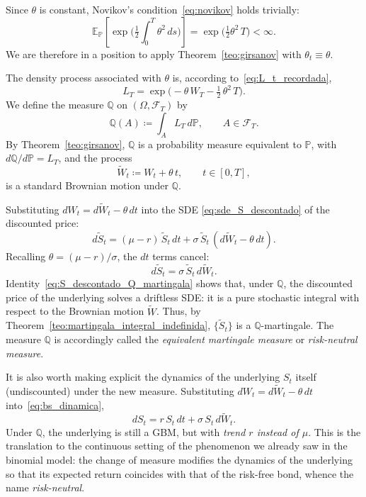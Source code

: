 \documentclass[11pt,a4paper,oneside]{report}
\theoremstyle{plain}
\theoremstyle{definition}
\theoremstyle{remark}
\newcommand{\E}{\mathbb{E}}
\newcommand{\PP}{\mathbb{P}}
\newcommand{\Q}{\mathbb{Q}}
\newcommand{\F}{\mathcal{F}}
\newcommand{\1}{\mathbf{1}}
\newcommand{\eqdef}{\coloneqq}
\begin{document}
Since $\theta$
is constant, Novikov's condition~\eqref{eq:novikov} holds trivially:
\begin{equation*}
  \E_\PP\!\left[\exp\!\biggl(\tfrac{1}{2}\int_0^T \theta^2\, ds\biggr)\right]
  = \exp\!\biggl(\tfrac{1}{2}\theta^2\, T\biggr) < \infty.
\end{equation*}
We are therefore in a position to apply Theorem~\ref{teo:girsanov}
with $\theta_t \equiv \theta$.

The density
process associated with $\theta$ is, according
to~\eqref{eq:L_t_recordada},
\begin{equation}\label{eq:L_T_BS}
  L_T = \exp\!\biggl(-\theta\, W_T - \tfrac{1}{2}\,\theta^2\, T\biggr).
\end{equation}
We define the measure $\Q$ on $(\Omega, \F_T)$ by
\begin{equation*}
  \Q(A) \eqdef \int_A L_T\, d\PP, \qquad A \in \F_T.
\end{equation*}
By Theorem~\ref{teo:girsanov}, $\Q$ is a probability measure
equivalent to $\PP$, with $d\Q/d\PP = L_T$, and the process
\begin{equation}\label{eq:W_tilde_BS}
  \widetilde W_t \eqdef W_t + \theta\, t,
  \qquad t \in [0, T],
\end{equation}
is a standard Brownian motion under $\Q$.

Substituting $dW_t = d\widetilde W_t - \theta\, dt$ into the SDE
\eqref{eq:sde_S_descontado} of the discounted price:
\begin{equation*}
  d\widetilde S_t = (\mu - r)\, \widetilde S_t\, dt
                  + \sigma\, \widetilde S_t\, (d\widetilde W_t - \theta\, dt).
\end{equation*}
Recalling $\theta = (\mu - r)/\sigma$, the $dt$ terms cancel:
\begin{equation}\label{eq:S_descontado_Q_martingala}
  \boxed{\; d\widetilde S_t = \sigma\, \widetilde S_t\, d\widetilde W_t. \;}
\end{equation}
Identity~\eqref{eq:S_descontado_Q_martingala} shows that, under $\Q$,
the discounted price of the underlying solves a driftless SDE: it is
a pure stochastic integral with respect to the Brownian motion
$\widetilde W$. Thus, by
Theorem~\ref{teo:martingala_integral_indefinida}, $\{\widetilde S_t\}$
is a $\Q$-martingale. The measure $\Q$ is accordingly called the
\emph{equivalent martingale measure} or \emph{risk-neutral measure}.

It is
also worth making explicit the dynamics of the underlying $S_t$
itself (undiscounted) under the new measure. Substituting
$dW_t = d\widetilde W_t - \theta\, dt$ into~\eqref{eq:bs_dinamica},
\begin{equation}\label{eq:S_dinamica_Q}
  \boxed{\; dS_t = r\, S_t\, dt + \sigma\, S_t\, d\widetilde W_t. \;}
\end{equation}
Under $\Q$, the underlying is still a GBM, but with \emph{trend $r$
instead of $\mu$}. This is the translation to the continuous setting
of the phenomenon we already saw in the binomial model: the change of
measure modifies the dynamics of the underlying so that its expected
return coincides with that of the risk-free bond, whence the name
\emph{risk-neutral}.
\end{document}
